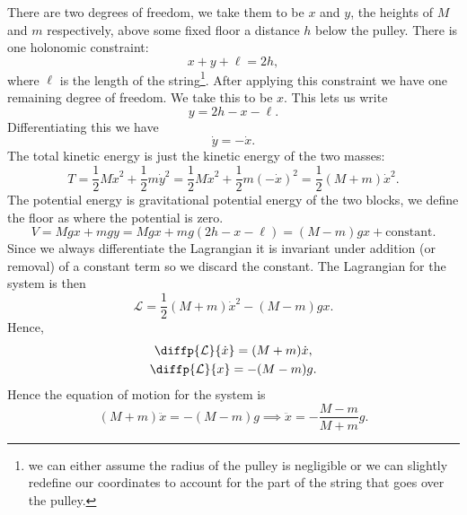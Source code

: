 \documentclass[fleqn]{NotesClass}
\newcommand*{\lagrangian}{\mathcal{L}}
\begin{document}
    There are two degrees of freedom, we take them to be \(x\) and \(y\), the heights of \(M\) and \(m\) respectively, above some fixed floor a distance \(h\) below the pulley.
    There is one holonomic constraint:
    \begin{equation}
        x + y + \ell = 2h,
    \end{equation}
    where \(\ell\) is the length of the string\footnote{we can either assume the radius of the pulley is negligible or we can slightly redefine our coordinates to account for the part of the string that goes over the pulley.}.
    After applying this constraint we have one remaining degree of freedom.
    We take this to be \(x\).
    This lets us write
    \begin{equation}
        y = 2h - x - \ell.
    \end{equation}
    Differentiating this we have
    \begin{equation}
        \dot{y} = -\dot{x}.
    \end{equation}
    The total kinetic energy is just the kinetic energy of the two masses:
    \begin{equation}
        T = \frac{1}{2}M\dot{x}^2 + \frac{1}{2}m\dot{y}^2 = \frac{1}{2}M\dot{x}^2 + \frac{1}{2}m(-\dot{x})^2 = \frac{1}{2}(M + m)\dot{x}^2.
    \end{equation}
    The potential energy is gravitational potential energy of the two blocks, we define the floor as where the potential is zero.
    \begin{equation}
        V = Mgx + mgy = Mgx + mg(2h - x - \ell) = (M - m)gx + \text{constant}.
    \end{equation}
    Since we always differentiate the Lagrangian it is invariant under addition (or removal) of a constant term so we discard the constant.
    The Lagrangian for the system is then
    \begin{equation}
        \lagrangian = \frac{1}{2}(M + m)\dot{x}^2 - (M - m)gx.
    \end{equation}
    Hence,
    \begin{gather}
        \diffp{\lagrangian}{\dot{x}} = (M + m)\dot{x},\\
        \diffp{\lagrangian}{x} = -(M - m)g.
    \end{gather}
    Hence the equation of motion for the system is
    \begin{equation}
        (M + m)\ddot{x} = -(M - m)g \implies \ddot{x} = -\frac{M - m}{M + m}g.
    \end{equation}
    
\end{document}
